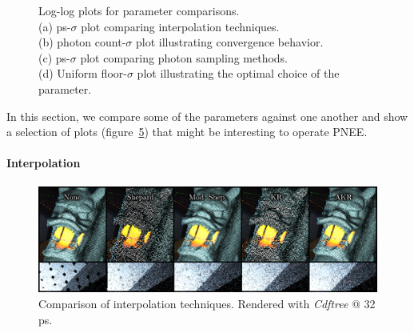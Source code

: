 \begin{figure}
    \centering
    \begin{subfigure}{.25\textwidth}
      \centering
        \caption{}
        \label{fig:intmain}
    \end{subfigure}%
    \begin{subfigure}{.25\textwidth}
        \caption{}
        \label{fig:pcplot}
    \end{subfigure}%
    \begin{subfigure}{.25\textwidth}
        \caption{}
        \label{fig:unipowplot}
    \end{subfigure}%
    \begin{subfigure}{.25\textwidth}
        \caption{}
        \label{fig:unifloorplot}
    \end{subfigure}
    \caption{Log-log plots for parameter comparisons. \\
    (a) ps-$\sigma$ plot comparing interpolation techniques. \\
    (b) photon count-$\sigma$ plot illustrating convergence behavior. \\
    (c) ps-$\sigma$ plot comparing photon sampling methods. \\
    (d) Uniform floor-$\sigma$ plot illustrating the optimal choice of the parameter.}
    \label{fig:parammain}
\end{figure}
In this section, we compare some of the parameters against one another and show a selection of plots (figure~\ref{fig:parammain}) that might be interesting to operate PNEE.

\paragraph{Interpolation}

\begin{figure}
    \centering
    \includegraphics[width=1\textwidth]{figures/comparisons/int_comp.pdf}
    \caption{Comparison of interpolation techniques. Rendered with \textit{Cdftree} @ 32 ps.}
    \label{fig:intcomp}
\end{figure}

